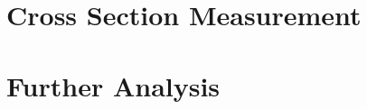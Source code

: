 \documentclass[12pt,twoside]{mitthesis}
\begin{document}
\chapter{Cross Section Measurement} \label{Chapter:BaseAnalysis}


\chapter{Further Analysis} \label{Chapter:Further Analysis}

\fi

\appendix
%



\end{document}
